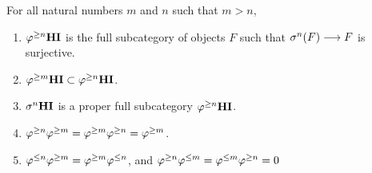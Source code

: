 \begin{prop}\label{prop_THI_properties}
For all natural numbers $m$ and $n$ such that $m > n$,

\begin{enumerate}
\item $\varphi^{\geq n}\mathbf{HI}$ is the full subcategory of objects $F$ such that 
$\sigma^{n}(F) \longrightarrow F$ is surjective.
\tinyskip

\item $\varphi^{\geq m}\mathbf{HI} \subset \varphi^{\geq n}\mathbf{HI}$.
\tinyskip

\item $\sigma^{n} \mathbf{HI}$ is a proper full subcategory $\varphi^{\geq n}\mathbf{HI}$.
\tinyskip

\item $\varphi^{\geq n}\varphi^{\geq m} = \varphi^{\geq m}\varphi^{\geq n} = \varphi^{\geq m}$.
\tinyskip

\item $\varphi^{\leq n}\varphi^{\geq m} = \varphi^{\geq m}\varphi^{\leq n}$, and $\varphi^{\geq n}\varphi^{\leq m} 
= \varphi^{\leq m}\varphi^{\geq n} = 0$ 
\tinyskip
\end{enumerate}
\end{prop}
